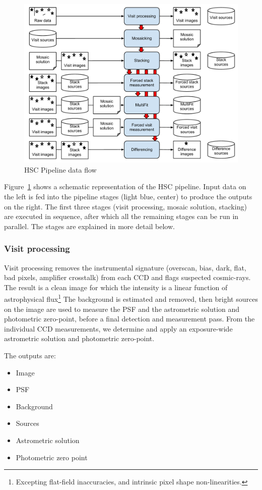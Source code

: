 \documentclass[12pt]{article}
\begin{document}
\begin{figure}[!htbp]
    \centering
    \includegraphics[scale=0.5]{figures/HSCpipelinesketch}
    \caption{HSC Pipeline data flow\label{fig:flow}}
\end{figure}

Figure~\ref{fig:flow} shows a schematic representation of the HSC pipeline.  Input data on the left is fed
into the pipeline stages (light blue, center) to produce the outputs on the right.  The first three stages
(visit processing, mosaic solution, stacking) are executed in sequence, after which all the remaining stages
can be run in parallel.  The stages are explained in more detail below.

\subsubsection{Visit processing}

Visit processing removes the instrumental signature (overscan, bias, dark, flat, bad pixels, amplifier
crosstalk) from each CCD and flags suspected cosmic-rays.  The result is a clean image for which the intensity
is a linear function of astrophysical flux\footnote{Excepting flat-field inaccuracies, and intrinsic pixel
  shape non-linearities.}  The background is estimated and removed, then bright sources on the image are used
to measure the PSF and the astrometric solution and photometric zero-point, before a final detection and
measurement pass.  From the individual CCD measurements, we determine and apply an exposure-wide astrometric
solution and photometric zero-point.

The outputs are:
\begin{itemize}
\item Image
\item PSF
\item Background
\item Sources
\item Astrometric solution
\item Photometric zero point
\end{itemize}
\end{document}
